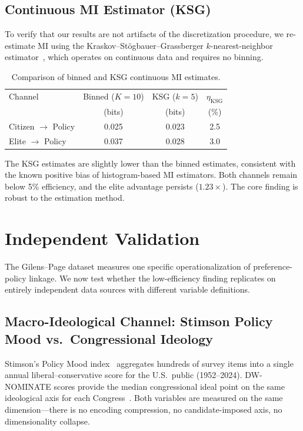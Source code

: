 \documentclass[twocolumn,10pt]{article}
\begin{document}
\subsection{Continuous MI Estimator (KSG)}

To verify that our results are not artifacts of the discretization procedure, we re-estimate MI using the Kraskov--St\"{o}gbauer--Grassberger $k$-nearest-neighbor estimator~\citep{kraskov2004}, which operates on continuous data and requires no binning.

\begin{table}[t]
\centering
\caption{Comparison of binned and KSG continuous MI estimates.}
\label{tab:ksg}
\begin{tabular}{@{}lccc@{}}
\toprule
Channel & Binned ($K{=}10$) & KSG ($k{=}5$) & $\eta_\text{KSG}$ \\
 & (bits) & (bits) & (\%) \\
\midrule
Citizen $\to$ Policy & 0.025 & 0.023 & 2.5 \\
Elite $\to$ Policy & 0.037 & 0.028 & 3.0 \\
\bottomrule
\end{tabular}
\end{table}

The KSG estimates are slightly lower than the binned estimates, consistent with the known positive bias of histogram-based MI estimators.  Both channels remain below 5\% efficiency, and the elite advantage persists ($1.23\times$).  The core finding is robust to the estimation method.

\section{Independent Validation}
\label{sec:validation}

The Gilens--Page dataset measures one specific operationalization of preference-policy linkage.  We now test whether the low-efficiency finding replicates on entirely independent data sources with different variable definitions.

\subsection{Macro-Ideological Channel: Stimson Policy Mood vs.\ Congressional Ideology}

Stimson's Policy Mood index~\citep{stimson2004} aggregates hundreds of survey items into a single annual liberal--conservative score for the U.S.\ public (1952--2024).  DW-NOMINATE scores provide the median congressional ideal point on the same ideological axis for each Congress~\citep{poole1985}.  Both variables are measured on the same dimension---there is no encoding compression, no candidate-imposed axis, no dimensionality collapse.
\end{document}

